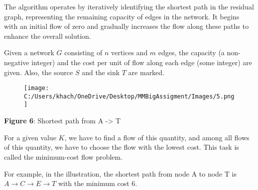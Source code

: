 \documentclass[a4paper]{article}
\begin{document}
		The algorithm operates by iteratively identifying the shortest path in the residual graph, representing the remaining capacity of edges in the network. It begins with an initial flow of zero and gradually increases the flow along these paths to enhance the overall solution.
		
		Given a network \(G\) consisting of \(n\) vertices and \(m\) edges, the capacity (a non-negative integer) and the cost per unit of flow along each edge (some integer) are given. Also, the source \(S\) and the sink \(T\) are marked.
		\begin{figure}[htbp]
			\centering
			\texttt{[image: C:/Users/khach/OneDrive/Desktop/MMBigAssigment/Images/5.png]}
		\end{figure}
		\begin{center}
			\textbf{Figure 6}: Shortest path from A -> T
		\end{center}
		For a given value \(K\), we have to find a flow of this quantity, and among all flows of this quantity, we have to choose the flow with the lowest cost. This task is called the minimum-cost flow problem.
		
		For example, in the illustration, the shortest path from node A to node T is \(A \rightarrow C \rightarrow E \rightarrow T\) with the minimum cost 6.
\end{document}
